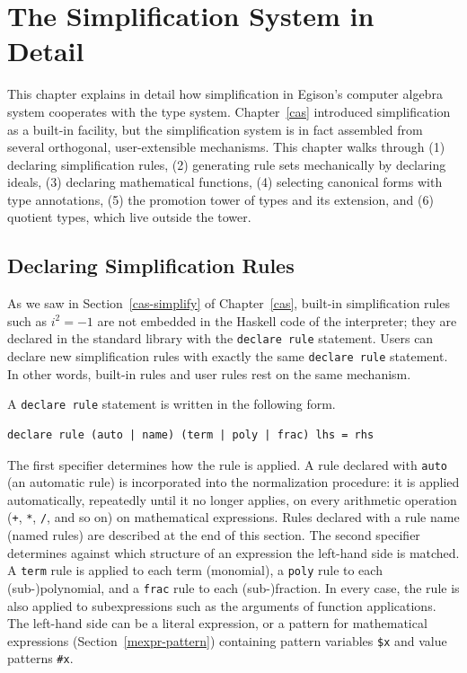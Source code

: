 \chapter{The Simplification System in Detail}\label{casdetail}

This chapter explains in detail how simplification in Egison's computer algebra system cooperates with the type system.
Chapter~\ref{cas} introduced simplification as a built-in facility, but the simplification system is in fact assembled from several orthogonal, user-extensible mechanisms.
This chapter walks through (1) declaring simplification rules, (2) generating rule sets mechanically by declaring ideals, (3) declaring mathematical functions, (4) selecting canonical forms with type annotations, (5) the promotion tower of types and its extension, and (6) quotient types, which live outside the tower.

\section{Declaring Simplification Rules}\label{cas-rule}

As we saw in Section~\ref{cas-simplify} of Chapter~\ref{cas}, built-in simplification rules such as $i^2 = -1$ are not embedded in the Haskell code of the interpreter; they are declared in the standard library with the \lstinline{declare rule} statement.
Users can declare new simplification rules with exactly the same \lstinline{declare rule} statement.
In other words, built-in rules and user rules rest on the same mechanism.

A \lstinline{declare rule} statement is written in the following form.
\begin{lstlisting}[language=egison,numbers=none]
declare rule (auto | name) (term | poly | frac) lhs = rhs
\end{lstlisting}
The first specifier determines how the rule is applied.
A rule declared with \lstinline{auto} (an automatic rule) is incorporated into the normalization procedure: it is applied automatically, repeatedly until it no longer applies, on every arithmetic operation (\lstinline{+}, \lstinline{*}, \lstinline{/}, and so on) on mathematical expressions.
Rules declared with a rule name (named rules) are described at the end of this section.
The second specifier determines against which structure of an expression the left-hand side is matched.
A \lstinline{term} rule is applied to each term (monomial), a \lstinline{poly} rule to each (sub-)polynomial, and a \lstinline{frac} rule to each (sub-)fraction.
In every case, the rule is also applied to subexpressions such as the arguments of function applications.
The left-hand side can be a literal expression, or a pattern for mathematical expressions (Section~\ref{mexpr-pattern}) containing pattern variables \lstinline{$x} and value patterns \lstinline{#x}.

